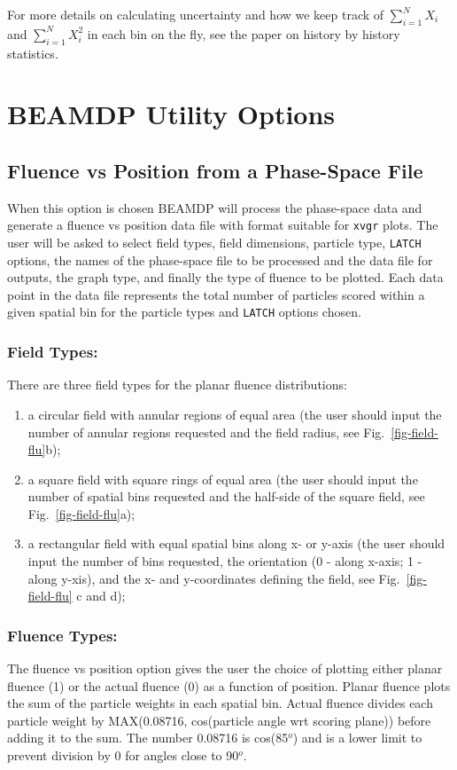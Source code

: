 \documentclass[12pt,twoside]{article}
\begin{document}
For more details on calculating uncertainty and how we keep track of
$\sum_{i=1}^{N}X_i$ and $\sum_{i=1}^{N}X_i^2$ in each bin on the fly,
see the paper on history by history statistics\cite{Wa02a}.

\section{BEAMDP Utility Options}
\subsection{Fluence vs Position from a Phase-Space File}

When this option is chosen BEAMDP will process the phase-space data and
generate a fluence vs position data file with format suitable for \verb+xvgr+ plots.
The user will be asked to select field types, field dimensions, particle
type, \verb+LATCH+ options, the names of the
phase-space file to be processed and the data file for outputs, the graph
type, and finally the type of fluence to be plotted.  Each data
point in the data file represents the total number of particles scored
within a given spatial bin for the particle types and \verb+LATCH+ options
chosen.

\subsubsection{Field Types:}
There are three field types for the planar fluence distributions:
\begin{enumerate}
\item a circular field with annular regions of equal area (the user should
input the number of annular regions requested and the field radius, see
Fig.~\ref{fig-field-flu}b);
\item a square field with square rings of equal area (the user should
input the number of spatial bins requested and the half-side of the square
field, see Fig.~\ref{fig-field-flu}a);
\item a rectangular field with equal spatial bins along x- or y-axis (the
user should input the number of bins requested, the orientation (0 - along
x-axis; 1 - along y-xis), and the x- and y-coordinates defining the field,
see Fig.~\ref{fig-field-flu} c and d); \end{enumerate}

\subsubsection{Fluence Types:}
\label{fluencetype1}
The fluence vs position option gives the user the choice of plotting
either planar fluence (1) or the actual fluence (0) as a function of
position.
Planar fluence plots the sum of the particle weights in each spatial
bin.  Actual fluence divides each particle weight by
MAX(0.08716, cos(particle angle wrt scoring plane)) before
adding it to the sum.  The number 0.08716 is cos(85$^o$) and is a lower limit
to prevent division by 0 for angles close to 90$^o$.
\end{document}
